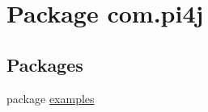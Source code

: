 \hypertarget{namespacecom_1_1pi4j}{}\section{Package com.\+pi4j}
\label{namespacecom_1_1pi4j}
\subsection*{Packages}
\begin{DoxyCompactItemize}
\item 
package \hyperlink{namespacecom_1_1pi4j_1_1examples}{examples}
\end{DoxyCompactItemize}
